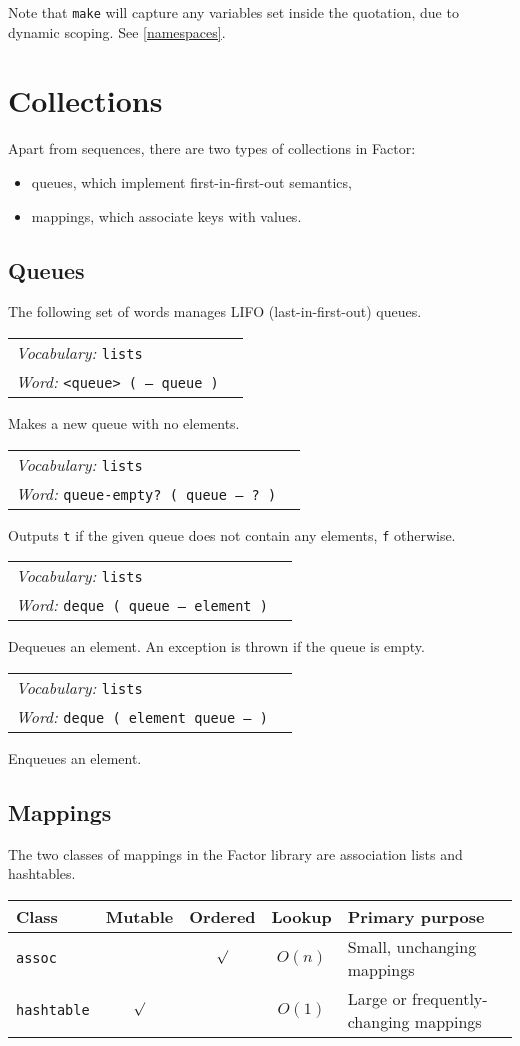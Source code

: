 \documentclass{book}
\newcommand{\vocabulary}[1]{\emph{Vocabulary:} \texttt{#1}&\\}
\newcommand{\ordinaryword}[2]{\index{\texttt{#1}}\emph{Word:} \texttt{#2}&\\}
\newcommand{\wordtable}[1]{


\begin{tabularx}{12cm}{lX}
\hline
#1
\hline
\end{tabularx}

}
\begin{document}
Note that \verb|make| will capture any variables set inside the quotation, due to dynamic scoping. See \ref{namespaces}.

\chapter{Collections}


Apart from sequences, there are two types of collections in Factor:
\begin{itemize}
\item queues, which implement first-in-first-out semantics,
\item mappings, which associate keys with values.
\end{itemize}

\section{Queues}

The following set of words manages LIFO (last-in-first-out) queues.

\wordtable{
\vocabulary{lists}
\ordinaryword{<queue>}{<queue> ( -- queue )}
}
Makes a new queue with no elements.
\wordtable{
\vocabulary{lists}
\ordinaryword{queue-empty?}{queue-empty?~( queue -- ?~)}
}
Outputs \texttt{t} if the given queue does not contain any elements, \texttt{f} otherwise.
\wordtable{
\vocabulary{lists}
\ordinaryword{deque}{deque ( queue -- element )}
}
Dequeues an element. An exception is thrown if the queue is empty.
\wordtable{
\vocabulary{lists}
\ordinaryword{enque}{deque ( element queue -- )}
}
Enqueues an element.

\section{Mappings}

The two classes of mappings in the Factor library are association lists and hashtables.

\begin{tabular}[t]{l|c|c|c|l}
Class&Mutable&Ordered&Lookup&Primary purpose\\
\hline
\texttt{assoc}&&$\surd$&$O(n)$&Small, unchanging mappings\\
\texttt{hashtable}&$\surd$&&$O(1)$&Large or frequently-changing mappings
\end{tabular}
\end{document}
